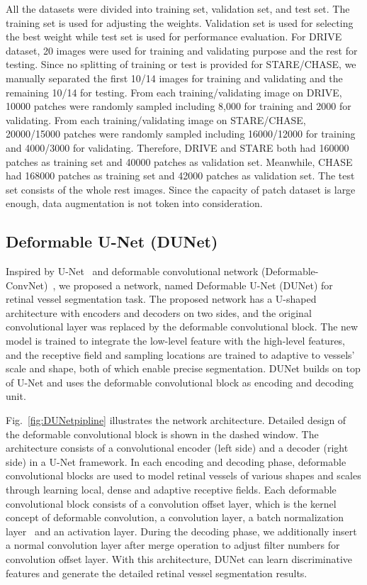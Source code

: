 \documentclass[journal]{IEEEtran}
\begin{document}
All the datasets were divided into training set, validation set, and test set. The training set is used for adjusting the weights. Validation set is used for selecting the best weight while test set is used for performance evaluation. For DRIVE dataset, 20 images were used for training and validating purpose and the rest for testing. Since no splitting of training or test is provided for STARE/CHASE, we manually separated the first 10/14 images for training and validating and the remaining 10/14 for testing. From each training/validating image on DRIVE, 10000 patches were randomly sampled including 8,000 for training and 2000 for validating. From each training/validating image on STARE/CHASE, 20000/15000 patches were randomly sampled including 16000/12000 for training and 4000/3000 for validating. Therefore, DRIVE and STARE both had 160000 patches as training set and 40000 patches as validation set. Meanwhile, CHASE had 168000 patches as training set and 42000 patches as validation set. The test set consists of the whole rest images. Since the capacity of patch dataset is large enough, data augmentation is not token into consideration.

\subsection{Deformable U-Net (DUNet)}
Inspired by U-Net~\cite{ronneberger_u-net:_2015} and deformable convolutional network (Deformable-ConvNet)~\cite{dai_deformable_2017}, we proposed a network, named Deformable U-Net (DUNet) for retinal vessel segmentation task. The proposed network has a U-shaped architecture with encoders and decoders on two sides, and the original convolutional layer was replaced by the deformable convolutional block. The new model is trained to integrate the low-level feature with the high-level features, and the receptive field and sampling locations are trained to adaptive to vessels' scale and shape, both of which enable precise segmentation. DUNet builds on top of U-Net and uses the deformable convolutional block as encoding and decoding unit.

Fig.~\ref{fig:DUNetpipline} illustrates the network architecture. Detailed design of the deformable convolutional block is shown in the dashed window. The architecture consists of a convolutional encoder (left side) and a decoder (right side) in a U-Net framework. In each encoding and decoding phase, deformable convolutional blocks are used to model retinal vessels of various shapes and scales through learning local, dense and adaptive receptive fields. Each deformable convolutional block consists of a convolution offset layer, which is the kernel concept of deformable convolution, a convolution layer, a batch normalization layer~\cite{ioffe_batch_2015} and an activation layer. During the decoding phase, we additionally insert a normal convolution layer after merge operation to adjust filter numbers for convolution offset layer. With this architecture, DUNet can learn discriminative features and generate the detailed retinal vessel segmentation results.
\end{document}
